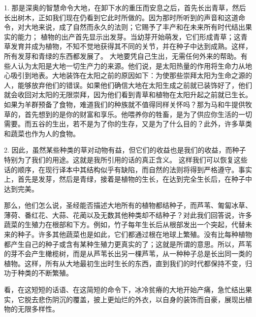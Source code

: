 1.   那是深奥的智慧命令大地，在卸下水的重压而安息之后，首先长出青草，然后长出树木，正如我们现在仍看到它此时所做的。因为那时所听到的声音和这道命令，对大地来说，成了自然而永久的法则；它赐予了丰产和在未来所有时代结出果实的能力； 植物的出产首先显示出发芽。当幼芽开始萌发，它们形成青草；这青草发育并成为植物，不知不觉地获得其不同的关节，并在种子中达到成熟。这样，所有发芽和青绿的东西都发展了。 大地要凭自己生出，无需任何外来的帮助。有些人认为太阳是大地一切生产力的来源。他们说，是太阳热量的作用将生命力从地心吸引到地表。大地装饰在太阳之前的原因如下：为使那些崇拜太阳为生命之源的人，能够放弃他们的错误。如果他们确信大地在太阳生成之前就已装饰好了，他们就会收回对太阳的无限崇拜，因为他们看到青草和植物在太阳升起之前就已生长。如果为羊群预备了食物，难道我们的种族就不值得同样关怀吗？那为马和牛提供牧草的，首先想到的是你的财富和享乐。他喂养你的牲畜，是为了供应你生活的一切需要。而五谷的生出，若不是为了你的生存，又是为了什么目的？此外，许多草类和蔬菜也作为人的食物。\par

2.  因此，虽然某些种类的草对动物有益，但它们的收益也是我们的收益，而种子特别为了我们的用途。这就是我所引用的话的真正含义。 这样我们可以恢复这些话的顺序，在现行译本中其结构似乎有缺陷，而自然的法则将得到严格遵守。事实上，首先是发芽，然后是青绿，接着是植物的生长，在达到完全生长后，在种子中达到完美。\par

那么，他们怎么说，圣经能否描述大地所有的植物都结种子，而芦苇、匍匐冰草、薄荷、番红花、大蒜、花蔺以及无数其他种类却不结种子？对此我们回答说，许多蔬菜的生殖力在根部和下方。例如，竹子每年生长后从根部发出一个突起，代替未来的种子。许多其他蔬菜也是如此，它们都通过根在地球上繁殖。没有比每种植物都产生自己的种子或含有某种生殖力更真实的了；这就是所谓的意思。所以，芦苇的芽不会产生橄榄树，而是从芦苇长出另一棵芦苇，从一种种子总是长出同一类的植物。这样，所有从大地最初生出时生长的东西，直到我们的时代都保持不变，归功于种类的不断繁殖。\par

 看，在这短短的话语、在这简短的命令下，冰冷贫瘠的大地开始产痛，急忙结出果实，它脱去悲伤阴沉的覆盖，披上更灿烂的外衣，以自身的装饰而自豪，展现出植物的无限多样性。\par

